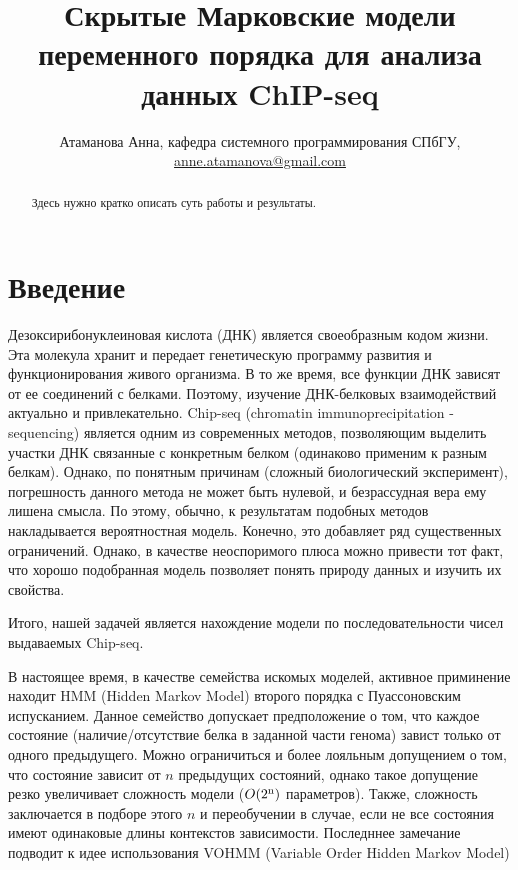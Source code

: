 \documentclass[10pt,a4paper]{article}
\begin{document}
\title{Скрытые Марковские модели переменного порядка для анализа данных
  ChIP-seq}
\author{Атаманова Анна, кафедра системного программирования СПбГУ, \url{anne.atamanova@gmail.com}}

\maketitle

\begin{abstract}
  Здесь нужно кратко описать суть работы и результаты.
\end{abstract}

\section{Введение}

Дезоксирибонуклеиновая кислота (ДНК) является своеобразным кодом жизни. Эта молекула хранит и передает генетическую программу развития и функционирования живого организма.
В то же время, все функции ДНК зависят от ее соединений с белками.
Поэтому, изучение ДНК-белковых взаимодействий актуально и привлекательно.
Chip-seq (chromatin immunoprecipitation - sequencing)\cite{Johnson2007} является одним из современных методов, позволяющим выделить участки ДНК связанные с конкретным белком (одинаково применим к разным белкам).
Однако, по понятным причинам (сложный биологический эксперимент), погрешность данного метода не может быть нулевой, и безрассудная вера ему лишена смысла. По этому, обычно, к результатам подобных методов накладывается вероятностная модель. Конечно, это добавляет ряд существенных ограничений. Однако, в качестве неоспоримого плюса можно привести тот факт, что хорошо подобранная модель позволяет понять природу данных и изучить их свойства.

Итого, нашей задачей является нахождение модели по последовательности чисел выдаваемых Chip-seq.

В настоящее время, в качестве семейства искомых моделей, активное приминение находит HMM (Hidden Markov Model)\cite{Rabiner1989} второго порядка с Пуассоновским испусканием.
Данное семейство допускает предположение о том, что каждое состояние (наличие/отсутствие белка в заданной части генома) завист только от одного предыдущего.
Можно ограничиться и более лояльным допущением о том, что состояние зависит от $n$ предыдущих состояний, однако такое допущение резко увеличивает сложность модели ($O(2\textsuperscript{n})$ параметров). Также, сложность заключается в подборе этого $n$ и переобучении в случае, если не все состояния имеют одинаковые длины контекстов зависимости.
Последннее замечание подводит к идее использования VOHMM (Variable Order Hidden Markov Model)\cite{Wang2006}
\end{document}
